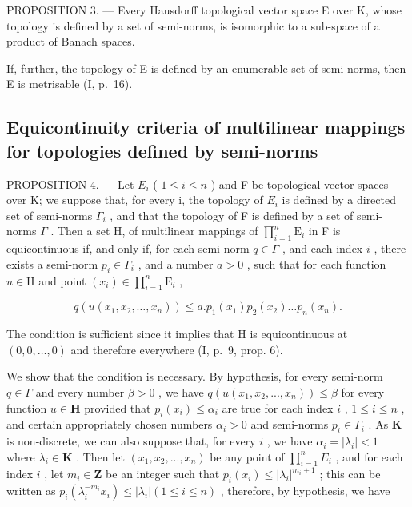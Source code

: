 PROPOSITION 3. --- Every Hausdorff topological vector space E over K, whose topology is defined by a set of semi-norms, is isomorphic to a sub-space of a product of Banach spaces.

If, further, the topology of E is defined by an enumerable set of semi-norms, then E is metrisable (I, p.~16).

\subsection{Equicontinuity criteria of multilinear mappings for topologies defined by semi-norms}

PROPOSITION 4. --- Let \(E_{i}\) ( \(1 \leqslant i \leqslant n\) ) and F be topological vector spaces over K; we suppose that, for every i, the topology of \(E_{i}\) is defined by a directed set of semi-norms \(\Gamma_{i}\) , and that the topology of F is defined by a set of semi-norms \(\Gamma\) . Then a set H, of multilinear mappings of \(\prod_{i=1}^{n} \mathrm{E}_{i}\) in F is equicontinuous if, and only if, for each semi-norm \(q \in \Gamma\) , and each index \(i\) , there exists a semi-norm \(p_{i} \in \Gamma_{i}\) , and a number \(a > 0\) , such that for each function \(u \in \mathrm{H}\) and point \((x_{i}) \in \prod_{i=1}^{n} \mathrm{E}_{i}\) ,

\[
q \left(u \left(x _ {1}, x _ {2}, \dots , x _ {n}\right)\right) \leqslant a. p _ {1} \left(x _ {1}\right) p _ {2} \left(x _ {2}\right) \dots p _ {n} \left(x _ {n}\right).\tag{5}
\]

The condition is sufficient since it implies that H is equicontinuous at \((0, 0, \ldots, 0)\) and therefore everywhere (I, p.~9, prop. 6).

We show that the condition is necessary. By hypothesis, for every semi-norm \(q \in \Gamma\) and every number \(\beta > 0\) , we have \(q(u(x_1, x_2, ..., x_n)) \leqslant \beta\) for every function \(u \in \mathbf{H}\) provided that \(p_i(x_i) \leqslant \alpha_i\) are true for each index \(i\) , \(1 \leqslant i \leqslant n\) , and certain appropriately chosen numbers \(\alpha_i > 0\) and semi-norms \(p_i \in \Gamma_i\) . As \(\mathbf{K}\) is non-discrete, we can also suppose that, for every \(i\) , we have \(\alpha_i = |\lambda_i| < 1\) where \(\lambda_i \in \mathbf{K}\) . Then let \((x_1, x_2, ..., x_n)\) be any point of \(\prod_{i=1}^{n} E_i\) , and for each index \(i\) , let \(m_i \in \mathbf{Z}\) be an integer such that \(p_i(x_i) \leqslant |\lambda_i|^{m_i + 1}\) ; this can be written as \(p_i(\lambda_i^{-m_i} x_i) \leqslant |\lambda_i| (1 \leqslant i \leqslant n)\) , therefore, by hypothesis, we have

